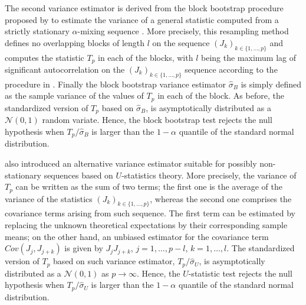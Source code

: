 The second variance estimator is derived from the block bootstrap procedure proposed by \cite{Carls} to estimate the variance
of a general statistic computed from a strictly stationary $\alpha$-mixing
sequence \citep[see][]{Bosq}. More precisely, this resampling method defines no overlapping blocks of length $l$ on the sequence 
$(J_k)_{k \in \{1, \dots, p\}}$ and computes the statistic $T_p$ in each of the blocks, with $l$ being the maximum lag of significant autocorrelation on the $(J_k)_{k \in \{1, \dots, p\}}$ sequence according to the procedure in \cite{PoW}. Finally the  block bootstrap variance estimator $\widehat \sigma_B$ is simply defined as the sample variance of the values of $T_p$ in each of the block. As before, the standardized version of $T_p$ based on  $\widehat{\sigma}_B$, is asymptotically distributed as a $\mathcal{N}(0,1)$ random variate. Hence, 
the block bootstrap test rejects the null hypothesis when $T_p/\widehat{\sigma}_B$ is larger than the $1-\alpha$
quantile of the standard normal distribution.


\cite{Marta2} also introduced
an alternative variance estimator suitable for
possibly non-stationary sequences based on $U$-statistics theory. More precisely, the variance of $T_p$ can be written as the sum of two terms; the first one is the average of the variance of the statistics $(J_k)_{k \in \{1, \dots, p\}}$, whereas the second one comprises the covariance terms arising from such sequence. The first term can be estimated by replacing the unknown theoretical expectations by their corresponding sample means; on the other hand, an unbiased estimator for the covariance term ${Cov}(J_j,J_{j+k})$ is given by $J_jJ_{j+k}$, $j=1, \dots, p-l$, $k=1, \dots, l$.  The standardized version of $T_p$ based on such variance estimator, $T_p/\widehat{\sigma}_U$, is asymptotically distributed as a $\mathcal{N}(0,1)$ as $p \rightarrow \infty$. Hence, 
the $U$-statistic test rejects the null hypothesis when $T_p/\widehat{\sigma}_U$ is larger than the $1-\alpha$
quantile of the standard normal distribution.


